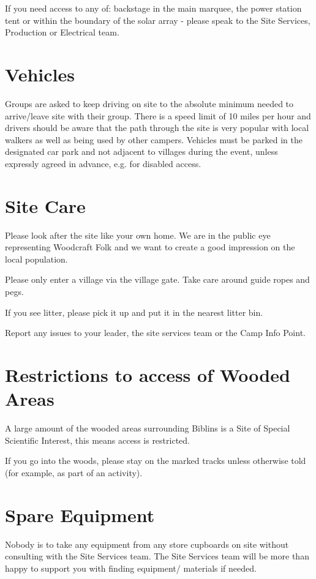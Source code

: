 \documentclass[a4paper, 11pt]{report}
\begin{document}
If you need access to any of: backstage in the main marquee, the power station tent or within the boundary of the solar array - please speak to the Site Services, Production or Electrical team.

\section{Vehicles}
Groups are asked to keep driving on site to the absolute minimum needed to arrive/leave site with their group. There is a speed limit of 10 miles per hour and drivers should be aware that the path through the site is very popular with local walkers as well as being used by other campers. Vehicles must be parked in the designated car park and not adjacent to villages during the event, unless expressly agreed in advance, e.g. for disabled access. 

\section{Site Care}
Please look after the site like your own home. We are in the public eye representing Woodcraft Folk and we want to create a good impression on the local population.\nl

Please only enter a village via the village gate. Take care around guide ropes and pegs. \nl


If you see litter, please pick it up and put it in the nearest litter bin.\nl

Report any issues to your leader, the site services team or the Camp Info Point.

\section{Restrictions to access of Wooded Areas}
A large amount of the wooded areas surrounding Biblins is a Site of Special Scientific Interest, this means access is restricted.\nl

If you go into the woods, please stay on the marked tracks unless otherwise told (for example, as part of an activity).

\section{Spare Equipment}
Nobody is to take any equipment from any store cupboards on site without consulting with the Site Services team. The Site Services team will be more than happy to support you with finding equipment/ materials if needed.
\end{document}

